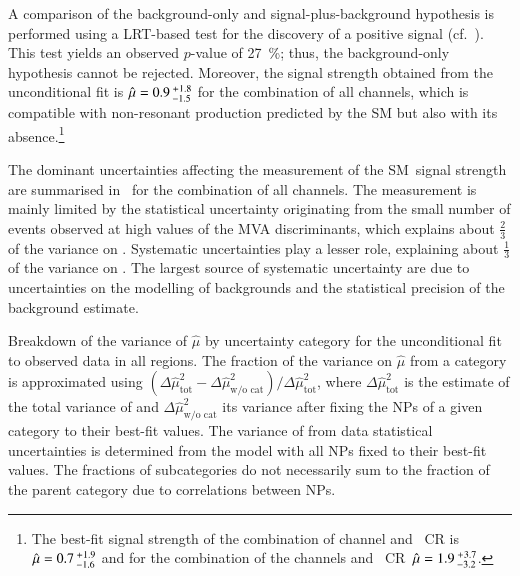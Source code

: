 A comparison of the background-only and signal-plus-background hypothesis is
performed using a LRT-based test for the discovery of a positive signal
(cf.~). This test yields an observed $p$-value of
\SI{27}{\percent}; thus, the background-only hypothesis cannot be rejected.
Moreover, the signal strength obtained from the unconditional fit is
$\hat{\mu} = 0.9\,^{\hspace{0.25pt}+\hspace{0.25pt}1.8}_{-1.5}$ for the
combination of all channels, which is compatible with non-resonant \HH
production predicted by the SM but also with its absence.\footnote{The best-fit
  signal strength of the combination of \hadhad channel and \ZHF~CR
  is~$\hat{\mu} = 0.7\,^{\hspace{0.25pt}+\hspace{0.25pt}1.9}_{-1.6}$ and for the
  combination of the \lephad channels and
  \ZHF~CR~$\hat{\mu} = 1.9\,^{\hspace{0.25pt}+\hspace{0.25pt}3.7}_{-3.2}$.}

The dominant uncertainties affecting the measurement of the SM~\HH signal
strength are summarised in~ for the combination of
all channels. The measurement is mainly limited by the statistical uncertainty
originating from the small number of events observed at high values of the MVA
discriminants, which explains about $\frac{2}{3}$ of the variance on
\muhat. Systematic uncertainties play a lesser role, explaining about
$\frac{1}{3}$ of the variance on \muhat. The largest source of systematic
uncertainty are due to uncertainties on the modelling of backgrounds and the
statistical precision of the background estimate.

\begin{table}[htbp]
  \centering

  \caption{Breakdown of the variance of $\hat{\mu}$ by uncertainty category for
    the unconditional fit to observed data in all regions. The fraction of the
    variance on $\hat{\mu}$ from a category is approximated using
    $(\Delta\hat{\mu}^2_{\text{tot}} - \Delta\hat{\mu}^2_{\text{w/o cat}}) /
    \Delta \hat{\mu}^2_{\text{tot}}$, where $\Delta\hat{\mu}^2_{\text{tot}}$ is
    the estimate of the total variance of \muhat and
    $\Delta\hat{\mu}^2_{\text{w/o cat}}$ its variance after fixing the NPs of a
    given category to their best-fit values. The variance of \muhat from data
    statistical uncertainties is determined from the model with all NPs fixed to
    their best-fit values. The fractions of subcategories do not necessarily sum
    to the fraction of the parent category due to correlations between NPs.}%
  \label{tab:breakdown_nonres}

  
\end{table}


